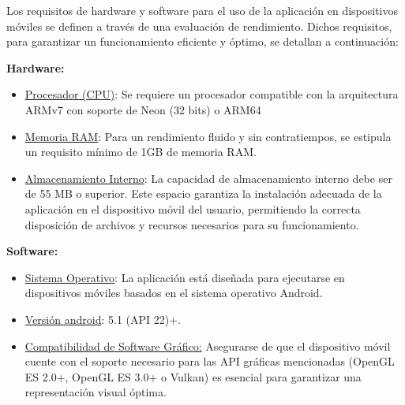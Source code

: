 Los requisitos de hardware y software para el uso de la aplicación en dispositivos móviles se definen a través de una evaluación de rendimiento. Dichos requisitos, para garantizar un funcionamiento eficiente y óptimo, se detallan a continuación:

\vspace{5pt}
\textbf{Hardware:}
\begin{itemize}
    \item \underline{Procesador (CPU)}: Se requiere un procesador compatible con la arquitectura ARMv7 con soporte de Neon (32 bits) o ARM64
    \item  \underline{Memoria RAM}: Para un rendimiento fluido y sin contratiempos, se estipula un requisito mínimo de 1GB de memoria RAM.  
    \item \underline{Almacenamiento Interno}: La capacidad de almacenamiento interno debe ser de 55 MB o superior. Este espacio garantiza la instalación adecuada de la aplicación en el dispositivo móvil del usuario, permitiendo la correcta disposición de archivos y recursos necesarios para su funcionamiento.   
\end{itemize}

\vspace{5pt}
\textbf{Software:}
\begin{itemize}
    \item \underline{Sistema Operativo}: La aplicación está diseñada para ejecutarse en dispositivos móviles basados en el sistema operativo Android.
    \item \underline{Versión android}: 5.1 (API 22)+.
    \item \underline{Compatibilidad de Software Gráfico:} Asegurarse de que el dispositivo móvil cuente con el soporte necesario para las API gráficas mencionadas (OpenGL ES 2.0+, OpenGL ES 3.0+ o Vulkan) es esencial para garantizar una representación visual óptima. 
\end{itemize} 